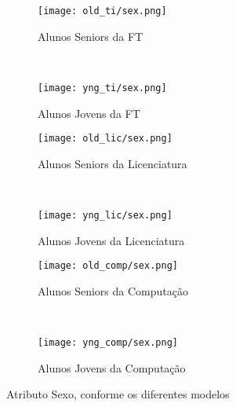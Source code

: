 \clearpage
\begin{figure}[!ht]
    \centering
    \begin{subfigure}[b]{0.48\textwidth}
        \centering
        \texttt{[image: old\_ti/sex.png]}
        \caption{Alunos Seniors da FT}
    \end{subfigure}
    ~
    \begin{subfigure}[b]{0.48\textwidth}
        \centering
        \texttt{[image: yng\_ti/sex.png]}
        \caption{Alunos Jovens da FT}
    \end{subfigure}

    \begin{subfigure}[b]{0.48\textwidth}
        \centering
        \texttt{[image: old\_lic/sex.png]}
        \caption{Alunos Seniors da Licenciatura}
    \end{subfigure}
    ~
    \begin{subfigure}[b]{0.48\textwidth}
        \centering
        \texttt{[image: yng\_lic/sex.png]}
        \caption{Alunos Jovens da Licenciatura}
    \end{subfigure}

    \begin{subfigure}[b]{0.48\textwidth}
        \centering
        \texttt{[image: old\_comp/sex.png]}
        \caption{Alunos Seniors da Computação}
    \end{subfigure}
    ~
    \begin{subfigure}[b]{0.48\textwidth}
        \centering
        \texttt{[image: yng\_comp/sex.png]}
        \caption{Alunos Jovens da Computação}
    \end{subfigure}
    \caption{Atributo Sexo, conforme os diferentes modelos}
\end{figure}

